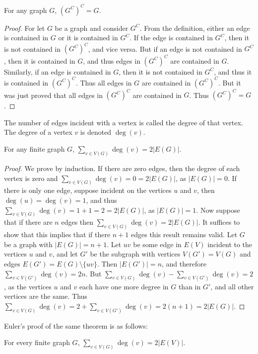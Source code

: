 \documentclass[crop=false,class=book,oneside]{standalone}
\begin{document}
        \begin{theorem}
        For any graph $G$, $(G^C)^C = G$.
        \end{theorem}
        \begin{proof}
        For let $G$ be a graph and consider $G^C$. From the definition, either an edge is contained in $G$ or it is contained in $G^C$. If the edge is contained in $G^C$, then it is not contained in $(G^C)^C$, and vice versa. But if an edge is not contained in $G^C$, then it is contained in $G$, and thus edges in $(G^C)^C$ are contained in $G$. Similarly, if an edge is contained in $G$, then it is not contained in $G^C$, and thus it is contained in $(G^C)^C$. Thus all edges in $G$ are contained in $(G^C)^C$. But it was just proved that all edges in $(G^C)^C$ are contained in $G$. Thus $(G^C)^C = G$.
        \end{proof}
        \begin{definition}
        The number of edges incident with a vertex is called the degree of that vertex. The degree of a vertex $v$ is denoted $\deg(v)$.
        \end{definition}
        \begin{theorem}
        For any finite graph $G$, $\sum_{v\in V(G)} \deg(v) = 2|E(G)|$.
        \end{theorem}
        \begin{proof}
        We prove by induction. If there are zero edges, then the degree of each vertex is zero and $\sum_{v\in V(G)}\deg(v) = 0 = 2|E(G)|$, as $|E(G)| = 0$. If there is only one edge, suppose incident on the vertices $u$ and $v$, then $\deg(u) = \deg(v) = 1$, and thus $\sum_{v\in V(G)} \deg(v) = 1+1 = 2 = 2|E(G)|$, as $|E(G)| = 1$. Now suppose that if there are $n$ edges then $\sum_{v\in V(G)}\deg(v) = 2|E(G)|$. It suffices to show that this implies that if there $n+1$ edges this result remains valid. Let $G$ be a graph with $|E(G)| = n+1$. Let $uv$ be some edge in $E(V)$ incident to the vertices $u$ and $v$, and let $G'$ be the subgraph with vertices $V(G') = V(G)$ and edges $E(G')=E(G)\setminus \{uv\}$. Then $|E(G')| = n$, and therefore $\sum_{v\in V(G')}\deg(v) = 2n$. But $\sum_{v\in V(G)} \deg(v) - \sum_{v\in V(G')}\deg(v) = 2$, as the vertices $u$ and $v$ each have one more degree in $G$ than in $G'$, and all other vertices are the same. Thus $\sum_{v\in V(G)}\deg(v) = 2 + \sum_{v\in V(G')}\deg(v) = 2(n+1) = 2|E(G)|$.
        \end{proof}
        Euler's proof of the same theorem is as follows:
        \begin{theorem}
        For every finite graph $G$, $\sum_{v\in V(G)}\deg(v) = 2|E(V)|$.
        \end{theorem}
\end{document}
